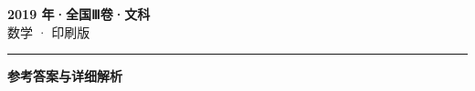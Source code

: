 \documentclass[zihao=5, a4paper]{ctexart}
\begin{document}
\begin{center}
  {\Large\bfseries 2019 年·全国Ⅲ卷·文科}\\[4pt]
  {\large 数学 · 印刷版}
\end{center}
\medskip
{}

\par\bigskip\hrule\bigskip
{}
\begin{center}{\large\bfseries 参考答案与详细解析}\end{center}
\smallskip

\end{document}
